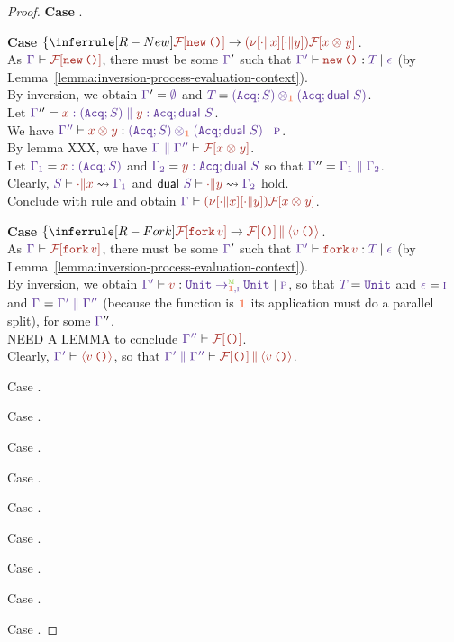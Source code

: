 \documentclass{article}
\begin{document}
\begin{proof}
  \textbf{Case} .

  \textbf{Case} $\left\{\RuleProcRedNew\right.$.\\
  As $\ProcHasType\Ctx {\FCapp{\EApp \CNew \CUnit}}$, there must be
  some $\Ctx'$ such that
  $\HasType{\Ctx'}{\EApp \CNew \CUnit}{\T}{\Eff}$ (by Lemma~\ref{lemma:inversion-process-evaluation-context}). \\
  By inversion, we obtain $\Ctx' = \CtxEmpty$ and $\T =
  \TPairUnord{(\SSeq{\SAcq}{\S})}{(\SSeq{\SAcq}{\Dual~\S})}$. \\
  Let $\Ctx'' = \CtxPar{\CtxVar x{(\SSeq{\SAcq}{\S})} }{\CtxVar y
    {\SSeq{\SAcq}{\Dual~\S}}}$. \\
  We have
  $\HasType{\Ctx''}{\EPair
    xy}{\TPairUnord{(\SSeq{\SAcq}{\S})}{(\SSeq{\SAcq}{\Dual~\S})}}{\EffPure}$.
  \\
  By lemma XXX, we have
  $\ProcHasType{\CtxPar{\Ctx}{\Ctx''}}{\FCapp{\EPair xy}}$.
  \\
  Let $\Ctx[1] =\CtxVar x{(\SSeq{\SAcq}{\S})}$ and $\Ctx[2] = \CtxVar
  y {\SSeq{\SAcq}{\Dual~\S}}$ so that $\Ctx'' =
  \CtxPar{\Ctx[1]}{\Ctx[2]}$.
  \\
  Clearly, $\S \vdash {\BPar{\BEmp}{x}} \leadsto \Ctx[1]$ and
  $\Dual~\S \vdash {\BPar{\BEmp}{y}} \leadsto \Ctx[2]$ hold.
  \\
  Conclude with rule  and obtain
  $\ProcHasType {\Ctx}
  {\PNew {\BPar{\BEmp}{x}}{\BPar{\BEmp}{y}}{\FCapp{\EPair xy}}}$.

  

  \textbf{Case} $\left\{ \RuleProcRedFork \right.$.\\
  As $\ProcHasType\Ctx {\FCapp{\EApp \CFork \V}}$, there must be some
  $\Ctx'$ such that
  $\HasType{\Ctx'}{\EApp \CFork \V}{\T}{\Eff}$ (by
  Lemma~\ref{lemma:inversion-process-evaluation-context}). \\
  By inversion, we obtain
  $\HasType{\Ctx'}\V{\TArr{\MobMobile}{\DirUnord,\EffImpure}\BUnit\BUnit}\EffPure$,
  so that $\T = \BUnit$ and $\Eff = \EffImpure$ and $\Ctx =
  \CtxPar{\Ctx'}{\Ctx''}$ (because the function is $\DirUnord$ its
  application must do a parallel split), for some $\Ctx''$.
  \\
  NEED A LEMMA to conclude $\ProcHasType{\Ctx''}{\FCapp{\CUnit}}$.
  \\
  Clearly, $\ProcHasType{\Ctx'}{\PExp {\EApp\V\CUnit}}$, so that
  $\ProcHasType{\CtxPar{\Ctx'}{\Ctx''}}{\PPar{\FCapp{\CUnit}}{\PExp {\EApp\V\CUnit}}}$.

  Case .

  Case .

  Case .

  Case .

  Case .

  Case .

  Case .

  Case .

  Case .
\end{proof}
\end{document}
